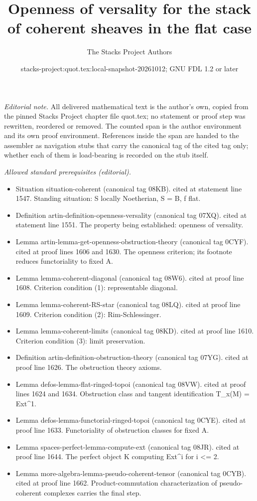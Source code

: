 \documentclass{stacks-project}
\title{Openness of versality for the stack of coherent sheaves in the flat case}
\author{The Stacks Project Authors}
\date{stacks-project:quot.tex:local-snapshot-20261012; GNU FDL 1.2 or later}
\theoremstyle{plain}
\theoremstyle{definition}
\theoremstyle{remark}
\numberwithin{equation}{subsection}
\begin{document}
\maketitle
\setcounter{subsection}{1}
\noindent\textit{Editorial note.} All delivered mathematical text is the author's own, copied from the pinned Stacks Project chapter file quot.tex; no statement or proof step was rewritten, reordered or removed. The counted span is the author environment and its own proof environment. References inside the span are handed to the assembler as navigation stubs that carry the canonical tag of the cited tag only; whether each of them is load-bearing is recorded on the stub itself.\par\medskip
\noindent\textit{Allowed standard prerequisites (editorial).}\begin{itemize}
\item Situation situation-coherent (canonical tag 08KB). cited at statement line 1547. Standing situation: S locally Noetherian, S = B, f flat.
\item Definition artin-definition-openness-versality (canonical tag 07XQ). cited at statement line 1551. The property being established: openness of versality.
\item Lemma artin-lemma-get-openness-obstruction-theory (canonical tag 0CYF). cited at proof lines 1606 and 1630. The openness criterion; its footnote reduces functoriality to fixed A.
\item Lemma lemma-coherent-diagonal (canonical tag 08W6). cited at proof line 1608. Criterion condition (1): representable diagonal.
\item Lemma lemma-coherent-RS-star (canonical tag 08LQ). cited at proof line 1609. Criterion condition (2): Rim-Schlessinger.
\item Lemma lemma-coherent-limits (canonical tag 08KD). cited at proof line 1610. Criterion condition (3): limit preservation.
\item Definition artin-definition-obstruction-theory (canonical tag 07YG). cited at proof line 1626. The obstruction theory axioms.
\item Lemma defos-lemma-flat-ringed-topoi (canonical tag 08VW). cited at proof lines 1624 and 1634. Obstruction class and tangent identification T\_x(M) = Ext\textasciicircum{}1.
\item Lemma defos-lemma-functorial-ringed-topoi (canonical tag 0CYE). cited at proof line 1633. Functoriality of obstruction classes for fixed A.
\item Lemma spaces-perfect-lemma-compute-ext (canonical tag 08JR). cited at proof line 1644. The perfect object K computing Ext\textasciicircum{}i for i <= 2.
\item Lemma more-algebra-lemma-pseudo-coherent-tensor (canonical tag 0CYB). cited at proof line 1662. Product-commutation characterization of pseudo-coherent complexes carries the final step.
\end{itemize}\medskip
\end{document}
